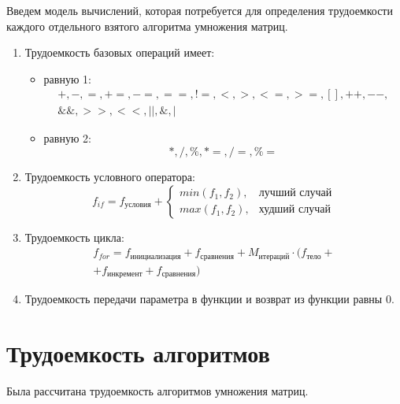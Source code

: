 Введем модель вычислений, которая потребуется для определения трудоемкости каждого отдельного взятого алгоритма умножения матриц.
\begin{enumerate}[label={\arabic*)}]
	\item Трудоемкость базовых операций имеет:
	\begin{itemize}[label=---]
		\item равную 1:
		\begin{equation}
			\label{for:operations_1}
			\begin{gathered}
				+, -, =, +=, -=, ==, !=, <, >, <=, >=, [], ++, {-}-,\\
				\&\&, >>, <<, ||, \&, |
			\end{gathered}
		\end{equation}
		\item равную 2:
		\begin{equation}
			\label{for:operations_2}
			*, /, \%, *=, /=, \%=
		\end{equation}
	\end{itemize}
	\item Трудоемкость условного оператора:
	\begin{equation}
		\label{for:if}
		f_{if} = f_{\text{условия}} + 
		\begin{cases}
			min(f_1, f_2), & \text{лучший случай}\\
			max(f_1, f_2), & \text{худший случай}
		\end{cases}
	\end{equation}
	\item Трудоемкость цикла:
	\begin{equation}
		\label{for:for}
		\begin{gathered}
			f_{for} = f_{\text{инициализация}} + f_{\text{сравнения}} + M_{\text{итераций}} \cdot (f_{\text{тело}} +\\
			+ f_{\text{инкремент}} + f_{\text{сравнения}})
		\end{gathered}
	\end{equation}
	\item Трудоемкость передачи параметра в функции и возврат из функции равны 0.
\end{enumerate}

\section{Трудоемкость алгоритмов}

Была рассчитана трудоемкость алгоритмов умножения матриц.

